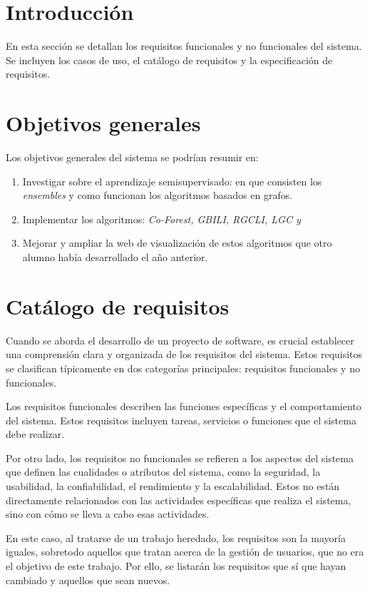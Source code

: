 \section{Introducción}
En esta sección se detallan los requisitos funcionales y no funcionales del sistema. Se incluyen los casos de uso, el catálogo de requisitos y la especificación de requisitos.

\section{Objetivos generales}
Los objetivos generales del sistema se podrían resumir en:

\begin{enumerate}
	\item Investigar sobre el aprendizaje semisupervisado: en que consisten los \textit{ensembles} y como funcionan los algoritmos basados en grafos.
	\item Implementar los algoritmos: \textit{Co-Forest, GBILI, RGCLI, LGC y}
	\item Mejorar y ampliar la web de visualización de estos algoritmos que otro alumno había desarrollado el año anterior.
\end{enumerate}
\section{Catálogo de requisitos}
Cuando se aborda el desarrollo de un proyecto de software, es crucial establecer una comprensión clara y organizada de los requisitos del sistema. Estos requisitos se clasifican típicamente en dos categorías principales: requisitos funcionales y no funcionales.

Los requisitos funcionales describen las funciones específicas y el comportamiento del sistema. Estos requisitos incluyen tareas, servicios o funciones que el sistema debe realizar.

Por otro lado, los requisitos no funcionales se refieren a los aspectos del sistema que definen las cualidades o atributos del sistema, como la seguridad, la usabilidad, la confiabilidad, el rendimiento y la escalabilidad. Estos no están directamente relacionados con las actividades específicas que realiza el sistema, sino con cómo se lleva a cabo esas actividades.

En este caso, al tratarse de un trabajo heredado, los requisitos son la mayoría iguales, sobretodo aquellos que tratan acerca de la gestión de usuarios, que no era el objetivo de este trabajo. Por ello, se listarán los requisitos que sí que hayan cambiado y aquellos que sean nuevos.

